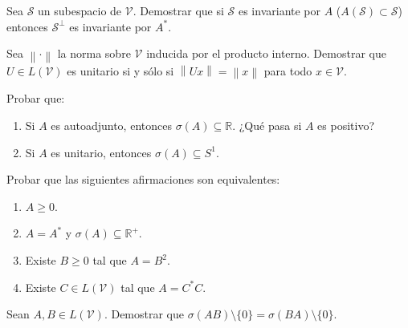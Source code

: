 \documentclass{article}
\newcommand{\R}{\mathbb{R}}
\newcommand{\norm}[1]{\left\lVert #1 \right\rVert}       %
\newenvironment{ejercicio}[1]{\begin{trivlist}
\item[\hskip \labelsep {\bfseries Ejercicio}\hskip \labelsep {\bfseries #1.}]}{\end{trivlist}}
\begin{document}
\vspace{0.5cm}

\begin{ejercicio}{6}
    Sea \(\mathcal{S}\) un subespacio de \(\mathcal{V}\). Demostrar que si \(\mathcal{S}\) es invariante por \(A\) (\(A(\mathcal{S})\subset\mathcal{S}\)) entonces \(\mathcal{S}^\perp\) es invariante por \(A^*\).
\end{ejercicio}

\vspace{0.5cm}

\begin{ejercicio}{7}
    Sea \(\norm{\cdot}\) la norma sobre \(\mathcal{V}\) inducida por el producto interno. Demostrar que \(U\in L(\mathcal{V})\) es unitario si y sólo si \(\norm{Ux} = \norm{x}\) para todo \(x\in\mathcal{V}\).
\end{ejercicio}

\vspace{0.5cm}

\begin{ejercicio}{8}
    Probar que:
    \begin{enumerate}
        \item Si \(A\) es autoadjunto, entonces \(\sigma(A)\subseteq\R\). ¿Qué pasa si \(A\) es positivo?
        \item Si \(A\) es unitario, entonces \(\sigma(A)\subseteq S^1\).
    \end{enumerate}
\end{ejercicio}

\vspace{0.5cm}

\begin{ejercicio}{9}
    Probar que las siguientes afirmaciones son equivalentes:
    \begin{enumerate}
        \item \(A\geq0\).
        \item \(A=A^*\) y \(\sigma(A)\subseteq\R^+\).
        \item Existe \(B\geq0\) tal que \(A=B^2\).
        \item Existe \(C\in L(\mathcal{V})\) tal que \(A=C^*C\).
    \end{enumerate}
\end{ejercicio}

\vspace{0.5cm}

\begin{ejercicio}{10}
    Sean \(A,B\in L(\mathcal{V})\). Demostrar que \(\sigma(AB)\setminus\{0\} = \sigma(BA)\setminus\{0\}\).
\end{ejercicio}
\end{document}

